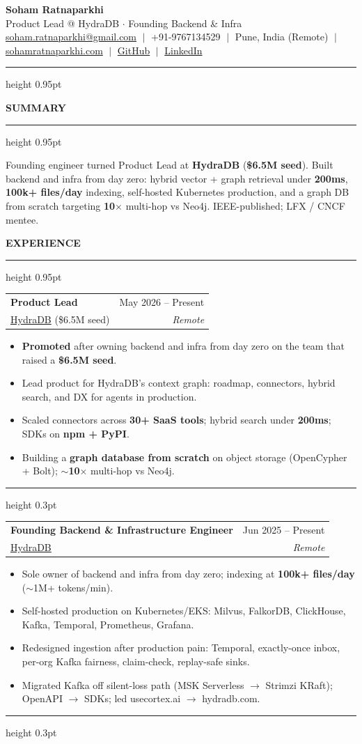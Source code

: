 \documentclass[9pt,letterpaper]{extarticle}
\makeatletter
\newcommand{\resumesection}[1]{%
  \par\vspace{0.34em}%
  {\color{Ink}\normalsize\bfseries #1}\par
  \vspace{0.1em}%
  {\color{Ink}\hrule height 0.95pt}\par
  \vspace{0.2em}%
  \nopagebreak
}
\newcommand{\role}[4]{%
  \noindent
  \begin{tabularx}{\textwidth}{@{}X r@{}}
    {\color{Ink}\textbf{#1}} & {\footnotesize\color{Muted}#3} \\[-0.08em]
    {\color{AccentBlue}#2} & {\footnotesize\color{Muted}\textit{#4}} \\
  \end{tabularx}%
  \vspace{0.02em}%
}
\newcommand{\roledivider}{%
  \par\vspace{0.16em}%
  {\color{RuleGrey}\hrule height 0.3pt}\par
  \vspace{0.24em}%
}
\makeatother
\begin{document}
\begin{center}
  {\color{Ink}\LARGE\bfseries Soham Ratnaparkhi}\\[0.16em]
  {\small\color{BodyGrey}Product Lead @ HydraDB $\cdot$ Founding Backend \& Infra}\\[0.2em]
  {\footnotesize\color{Muted}
    \href{mailto:soham.ratnaparkhi@gmail.com}{soham.ratnaparkhi@gmail.com}
    $\;|\;$ +91-9767134529
    $\;|\;$ Pune, India (Remote)
    $\;|\;$ \href{https://sohamratnaparkhi.com}{sohamratnaparkhi.com}
    $\;|\;$ \href{https://github.com/SohamRatnaparkhi}{GitHub}
    $\;|\;$ \href{https://www.linkedin.com/in/soham-ratnaparkhi-3a3775ab/}{LinkedIn}
  }
\end{center}
\vspace{0.06em}
{\color{Ink}\hrule height 0.95pt}

\resumesection{SUMMARY}
{\small
Founding engineer turned Product Lead at \textbf{HydraDB} (\textbf{\$6.5M seed}). Built backend and
infra from day zero: hybrid vector + graph retrieval under \textbf{200ms}, \textbf{100k+ files/day} indexing,
self-hosted Kubernetes production, and a graph DB from scratch targeting \textbf{10$\times$} multi-hop vs Neo4j.
IEEE-published; LFX / CNCF mentee.
}

\resumesection{EXPERIENCE}

\role{Product Lead}{\href{https://hydradb.com}{HydraDB} {\footnotesize(\$6.5M seed)}}{May 2026 -- Present}{Remote}
\begin{itemize}
  \item \textbf{Promoted} after owning backend and infra from day zero on the team that raised a \textbf{\$6.5M seed}.
  \item Lead product for HydraDB's context graph: roadmap, connectors, hybrid search, and DX for agents in production.
  \item Scaled connectors across \textbf{30+ SaaS tools}; hybrid search under \textbf{200ms}; SDKs on \textbf{npm + PyPI}.
  \item Building a \textbf{graph database from scratch} on object storage (OpenCypher + Bolt); $\sim$\textbf{10$\times$} multi-hop vs Neo4j.
\end{itemize}
\roledivider

\role{Founding Backend \& Infrastructure Engineer}{\href{https://hydradb.com}{HydraDB}}{Jun 2025 -- Present}{Remote}
\begin{itemize}
  \item Sole owner of backend and infra from day zero; indexing at \textbf{100k+ files/day} ($\sim$1M+ tokens/min).
  \item Self-hosted production on Kubernetes/EKS: Milvus, FalkorDB, ClickHouse, Kafka, Temporal, Prometheus, Grafana.
  \item Redesigned ingestion after production pain: Temporal, exactly-once inbox, per-org Kafka fairness, claim-check, replay-safe sinks.
  \item Migrated Kafka off silent-loss path (MSK Serverless $\rightarrow$ Strimzi KRaft); OpenAPI $\rightarrow$ SDKs; led usecortex.ai $\rightarrow$ hydradb.com.
\end{itemize}
\roledivider
\end{document}
